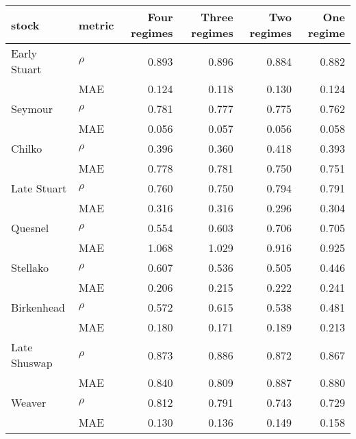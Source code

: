 \begin{tabular}{llrrrr}
  \hline
stock & metric & Four regimes & Three regimes & Two regimes & One regime \\ 
  \hline
Early Stuart & $\rho$ & 0.893 & 0.896 & 0.884 & 0.882 \\ 
  & MAE & 0.124 & 0.118 & 0.130 & 0.124 \\ 
  Seymour & $\rho$ & 0.781 & 0.777 & 0.775 & 0.762 \\ 
  & MAE & 0.056 & 0.057 & 0.056 & 0.058 \\ 
  Chilko & $\rho$ & 0.396 & 0.360 & 0.418 & 0.393 \\ 
  & MAE & 0.778 & 0.781 & 0.750 & 0.751 \\ 
  Late Stuart & $\rho$ & 0.760 & 0.750 & 0.794 & 0.791 \\ 
  & MAE & 0.316 & 0.316 & 0.296 & 0.304 \\ 
  Quesnel & $\rho$ & 0.554 & 0.603 & 0.706 & 0.705 \\ 
  & MAE & 1.068 & 1.029 & 0.916 & 0.925 \\ 
  Stellako & $\rho$ & 0.607 & 0.536 & 0.505 & 0.446 \\ 
  & MAE & 0.206 & 0.215 & 0.222 & 0.241 \\ 
  Birkenhead & $\rho$ & 0.572 & 0.615 & 0.538 & 0.481 \\ 
  & MAE & 0.180 & 0.171 & 0.189 & 0.213 \\ 
  Late Shuswap & $\rho$ & 0.873 & 0.886 & 0.872 & 0.867 \\ 
  & MAE & 0.840 & 0.809 & 0.887 & 0.880 \\ 
  Weaver & $\rho$ & 0.812 & 0.791 & 0.743 & 0.729 \\ 
  & MAE & 0.130 & 0.136 & 0.149 & 0.158 \\ 
   \hline
\end{tabular}
